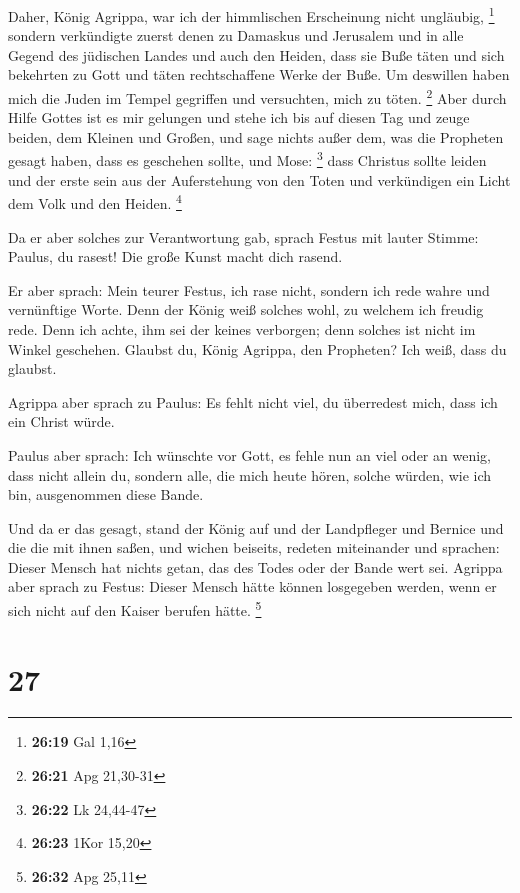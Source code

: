  Daher, König Agrippa, war ich der himmlischen Erscheinung
nicht ungläubig, \footnote{\textbf{26:19} Gal 1,16} 
sondern verkündigte zuerst denen zu Damaskus und Jerusalem und in alle
Gegend des jüdischen Landes und auch den Heiden, dass sie Buße täten und
sich bekehrten zu Gott und täten rechtschaffene Werke der Buße.
 Um deswillen haben mich die Juden im Tempel gegriffen und
versuchten, mich zu töten. \footnote{\textbf{26:21} Apg 21,30-31}
 Aber durch Hilfe Gottes ist es mir gelungen und stehe ich
bis auf diesen Tag und zeuge beiden, dem Kleinen und Großen, und sage
nichts außer dem, was die Propheten gesagt haben, dass es geschehen
sollte, und Mose: \footnote{\textbf{26:22} Lk 24,44-47} 
dass Christus sollte leiden und der erste sein aus der Auferstehung von
den Toten und verkündigen ein Licht dem Volk und den Heiden. \footnote{\textbf{26:23}
  1Kor 15,20}

 Da er aber solches zur Verantwortung gab, sprach Festus
mit lauter Stimme: Paulus, du rasest! Die große Kunst macht dich rasend.

 Er aber sprach: Mein teurer Festus, ich rase nicht,
sondern ich rede wahre und vernünftige Worte.  Denn der
König weiß solches wohl, zu welchem ich freudig rede. Denn ich achte,
ihm sei der keines verborgen; denn solches ist nicht im Winkel
geschehen.  Glaubst du, König Agrippa, den Propheten? Ich
weiß, dass du glaubst.

 Agrippa aber sprach zu Paulus: Es fehlt nicht viel, du
überredest mich, dass ich ein Christ würde.

 Paulus aber sprach: Ich wünschte vor Gott, es fehle nun an
viel oder an wenig, dass nicht allein du, sondern alle, die mich heute
hören, solche würden, wie ich bin, ausgenommen diese Bande.

 Und da er das gesagt, stand der König auf und der
Landpfleger und Bernice und die die mit ihnen saßen,  und
wichen beiseits, redeten miteinander und sprachen: Dieser Mensch hat
nichts getan, das des Todes oder der Bande wert sei. 
Agrippa aber sprach zu Festus: Dieser Mensch hätte können losgegeben
werden, wenn er sich nicht auf den Kaiser berufen hätte. \footnote{\textbf{26:32}
  Apg 25,11}

\hypertarget{section-6}{%
\section{27}\label{section-6}}

